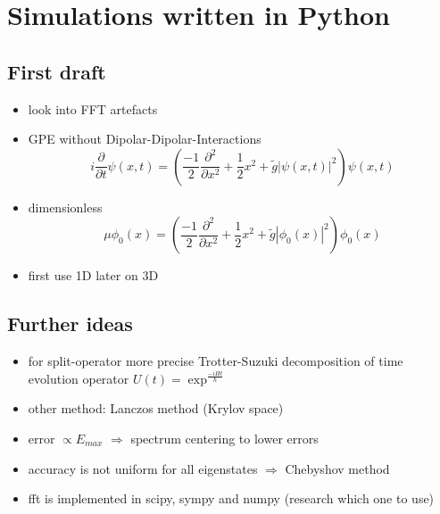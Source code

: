 \section{Simulations written in Python}

\subsection{First draft}
\begin{itemize}
    \item look into FFT artefacts
    \item GPE without Dipolar-Dipolar-Interactions
    \begin{equation}
        i \frac{\partial}{\partial t} \psi(x,t) = \left(\frac{-1}{2} \frac{\partial^{2}}{\partial x^{2}}
                                                + \frac{1}{2} x^{2} + \tilde{g} |\psi(x,t)|^{2} \right) \psi(x,t)
    \end{equation}
    \item dimensionless
    \begin{equation}
        \mu \phi_{0}(x) = \left(\frac{-1}{2} \frac{\partial^{2}}{\partial x^{2}}
                        + \frac{1}{2} x^{2} + \tilde{g} |\phi_{0}(x)|^{2} \right) \phi_{0}(x)
    \end{equation}
    \item first use 1D later on 3D
\end{itemize}

\subsection{Further ideas}
\begin{itemize}
    \item for split-operator more precise Trotter-Suzuki decomposition of time evolution operator
        $U(t) = \exp^{\frac{-i H t}{\hbar} }$
    \item other method: Lanczos method (Krylov space)
    \item error $\propto E_{max}$ $\Rightarrow$ spectrum centering to lower errors
    \item accuracy is not uniform for all eigenstates $\Rightarrow$ Chebyshov method
    \item fft is implemented in scipy, sympy and numpy (research which one to use)
\end{itemize}


